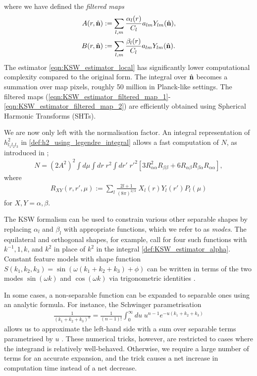 where we have defined the \textit{filtered maps}
\begin{align}
	A(r,\hat{\mathbf{n}}) &:= \sum_{l,m} \frac{\alpha_l(r)}{C_l} a_{lm} Y_{lm}(\hat{\mathbf{n}}), \label{eqn:KSW_estimator_filtered_map_1}\\
	B(r,\hat{\mathbf{n}}) &:= \sum_{l,m} \frac{\beta_l(r)}{C_l} a_{lm} Y_{lm}(\hat{\mathbf{n}}). \label{eqn:KSW_estimator_filtered_map_2}
\end{align}
The estimator \eqref{eqn:KSW_estimator_local} has significantly lower computational complexity compared to the original form. The integral over $\hat{\mathbf{n}}$ becomes a summation over map pixels, roughly 50 million in Planck-like settings. The filtered maps (\ref{eqn:KSW_estimator_filtered_map_1}-\ref{eqn:KSW_estimator_filtered_map_2}) are efficiently obtained using Spherical Harmonic Transforms (SHTs).

We are now only left with the normalisation factor. An integral representation of $h^2_{l_1 l_2 l_3}$ in \eqref{def:h2_using_legendre_integral} allows a fast computation of $N$, as introduced in \cite{Smith2011};
\begin{align}
	N = (2A^2)^2 \int d\mu \int dr \;r^2 \int dr' \; r'^2 \left[ 3R_{\alpha\alpha}^2 R_{\beta\beta} + 6R_{\alpha\beta} R_{\beta\alpha} R_{\alpha\alpha} \right],
\end{align}
where
\begin{align}
	R_{XY} (r,r',\mu) := \sum_l \frac{2l+1}{(8\pi)^{2/3}} \; X_l (r) Y_l (r') P_l(\mu)
\end{align}
for $X,Y=\alpha,\beta$.

The KSW formalism can be used to constrain various other separable shapes by replacing $\alpha_l$ and $\beta_l$ with appropriate functions, which we refer to as \textit{modes}. The equilateral and orthogonal shapes, for example, call for four such functions with $k^{-1}, 1, k$, and $k^2$ in place of $k^2$ in the integral \eqref{def:KSW_estimator_alpha}. Constant feature models with shape function $S(k_1,k_2,k_3) = \sin(\omega(k_1+k_2+k_3)+\phi)$ can be written in terms of the two modes $\sin(\omega k)$ and $\cos(\omega k)$ via trigonometric identities \cite{Munchmeyer2014}.

In some cases, a non-separable function can be expanded to separable ones using an analytic formula. For instance, the Schwinger parametrisation
\begin{align}
	\frac{1}{(k_1+k_2+k_3)^n} = \frac{1}{(n-1)!} \int_0^{\infty} du \; u^{n-1} e^{-u(k_1+k_2+k_3)}
\end{align}
allows us to approximate the left-hand side with a sum over separable terms parametrised by $u$ \cite{Smith2011}. These numerical tricks, however, are restricted to cases where the integrand is relatively well-behaved. Otherwise, we require a large number of terms for an accurate expansion, and the trick causes a net increase in computation time instead of a net decrease.

